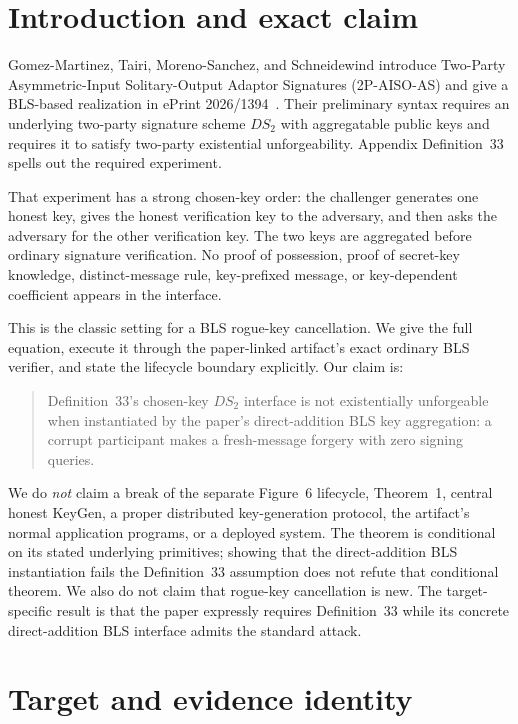 \documentclass[10pt,a4paper]{article}
\begin{document}
\section{Introduction and exact claim}

Gomez-Martinez, Tairi, Moreno-Sanchez, and Schneidewind introduce Two-Party
Asymmetric-Input Solitary-Output Adaptor Signatures (2P-AISO-AS) and give a
BLS-based realization in ePrint 2026/1394~\cite{target}. Their preliminary
syntax requires an underlying two-party signature scheme $DS_2$ with
aggregatable public keys and requires it to satisfy two-party existential
unforgeability. Appendix Definition~33 spells out the required experiment.

That experiment has a strong chosen-key order: the challenger generates one
honest key, gives the honest verification key to the adversary, and then asks
the adversary for the other verification key. The two keys are aggregated
before ordinary signature verification. No proof of possession, proof of
secret-key knowledge, distinct-message rule, key-prefixed message, or
key-dependent coefficient appears in the interface.

This is the classic setting for a BLS rogue-key cancellation. We give the
full equation, execute it through the paper-linked artifact's exact ordinary
BLS verifier, and state the lifecycle boundary explicitly. Our claim is:

\begin{quote}
Definition~33's chosen-key $DS_2$ interface is not existentially
unforgeable when instantiated by the paper's direct-addition BLS key
aggregation: a corrupt participant makes a fresh-message forgery with zero
signing queries.
\end{quote}

We do \emph{not} claim a break of the separate Figure~6 lifecycle,
Theorem~1, central honest \textsf{KeyGen}, a proper distributed key-generation
protocol, the artifact's normal application programs, or a deployed system.
The theorem is conditional on its stated underlying primitives; showing that
the direct-addition BLS instantiation fails the Definition~33 assumption does
not refute that conditional theorem. We also do not claim that rogue-key
cancellation is new. The target-specific result is that the paper expressly
requires Definition~33 while its concrete direct-addition BLS interface
admits the standard attack.

\section{Target and evidence identity}
\end{document}
